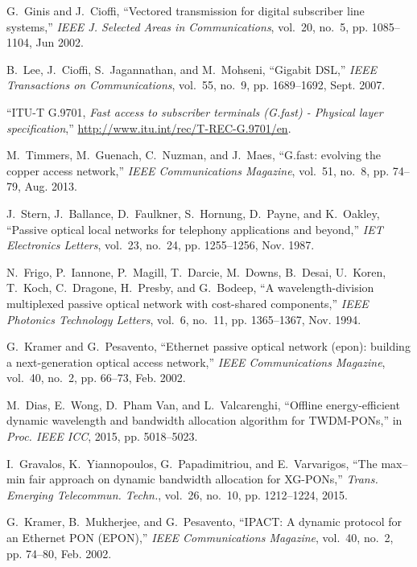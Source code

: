 \documentclass[pdftex,journal]{IEEEtran}
\begin{document}
\begin{thebibliography}{10}
G.~Ginis and J.~Cioffi, ``Vectored transmission for digital subscriber line
  systems,'' \emph{IEEE J. Selected Areas in Communications}, vol.~20, no.~5,
  pp. 1085--1104, Jun 2002.

B.~Lee, J.~Cioffi, S.~Jagannathan, and M.~Mohseni, ``Gigabit {DSL},''
  \emph{IEEE Transactions on Communications}, vol.~55, no.~9, pp. 1689--1692,
  Sept. 2007.

``{ITU-T G.9701}, \textit{Fast access to subscriber terminals (G.fast) -
  Physical layer specification},''
  \url{http://www.itu.int/rec/T-REC-G.9701/en}.

M.~Timmers, M.~Guenach, C.~Nuzman, and J.~Maes, ``G.fast: evolving the copper
  access network,'' \emph{IEEE Communications Magazine}, vol.~51, no.~8, pp.
  74--79, Aug. 2013.

J.~Stern, J.~Ballance, D.~Faulkner, S.~Hornung, D.~Payne, and K.~Oakley,
  ``Passive optical local networks for telephony applications and beyond,''
  \emph{IET Electronics Letters}, vol.~23, no.~24, pp. 1255--1256, Nov. 1987.

N.~Frigo, P.~Iannone, P.~Magill, T.~Darcie, M.~Downs, B.~Desai, U.~Koren,
  T.~Koch, C.~Dragone, H.~Presby, and G.~Bodeep, ``A wavelength-division
  multiplexed passive optical network with cost-shared components,'' \emph{IEEE
  Photonics Technology Letters}, vol.~6, no.~11, pp. 1365--1367, Nov. 1994.

G.~Kramer and G.~Pesavento, ``Ethernet passive optical network (epon): building
  a next-generation optical access network,'' \emph{IEEE Communications
  Magazine}, vol.~40, no.~2, pp. 66--73, Feb. 2002.

M.~Dias, E.~Wong, D.~{Pham Van}, and L.~Valcarenghi, ``Offline energy-efficient
  dynamic wavelength and bandwidth allocation algorithm for {TWDM-PONs},'' in
  \emph{Proc. IEEE ICC}, 2015, pp. 5018--5023.

I.~Gravalos, K.~Yiannopoulos, G.~Papadimitriou, and E.~Varvarigos, ``The
  max--min fair approach on dynamic bandwidth allocation for {XG-PONs},''
  \emph{Trans. Emerging Telecommun. Techn.}, vol.~26, no.~10, pp. 1212--1224,
  2015.

G.~Kramer, B.~Mukherjee, and G.~Pesavento, ``{IPACT: A dynamic protocol for an
  Ethernet PON (EPON)},'' \emph{IEEE Communications Magazine}, vol.~40, no.~2,
  pp. 74--80, Feb. 2002.


\end{thebibliography}
\end{document}
